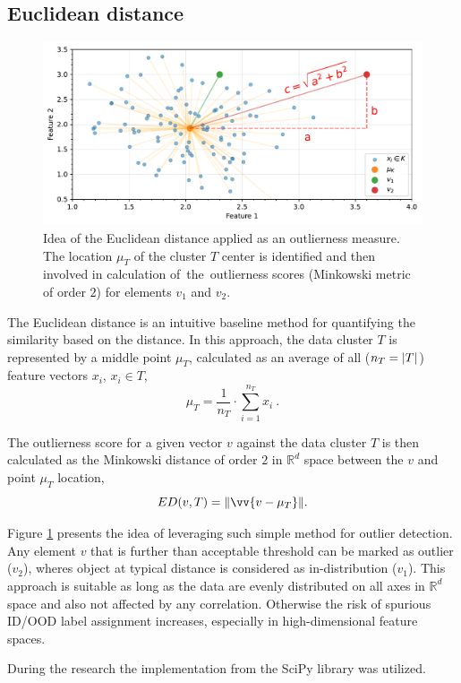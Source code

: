 \subsection{Euclidean distance}
\label{section:Euclidean}

\begin{figure}[t]
    \centering
    \includegraphics[width=\textwidth]{images/measures/euclidean-distance.pdf}
    \caption{Idea of the Euclidean distance applied as an outlierness measure. \\
             The location $\mu_T$ of the cluster $T$ center is identified and then involved
             in calculation of~the~outlierness scores (Minkowski metric of order $2$) for elements $v_1$ and $v_2$.}
    \label{fig:ed-idea}
\end{figure}

The Euclidean distance is an intuitive baseline method for quantifying the similarity based on the distance. In this approach, the data cluster $T$ is represented by a middle point $\mu_{T}$, calculated as an average of all ($n_{T} = \abs{T}$) feature vectors $x_i$, $x_i \in T$,
\begin{equation}
    \mu_{T} = \frac{1}{n_{T}} \cdot \sum_{i=1}^{n_{T}} x_i
    ~.
    \label{eq:mu_T}
\end{equation}

The outlierness score for a given vector $v$ against the data cluster $T$ is then calculated as the Minkowski distance of order $2$ in $\mathbb{R}^d$ space between the $v$ and point $\mu_{T}$ location,
\begin{equation}
    ED(v, T) = \norm{\vv{v - \mu_{T}}}
    .
    \label{eq:ed}
\end{equation}

Figure \ref{fig:ed-idea} presents the idea of leveraging such simple method for outlier detection. Any element $v$ that is further than acceptable threshold can be marked as outlier ($v_2$), wheres object at typical distance is considered as in-distribution ($v_1$). This approach is suitable as long as the data are evenly distributed on all axes in $\mathbb{R}^d$ space and also not affected by any correlation. Otherwise the risk of spurious ID/OOD label assignment increases, especially in high-dimensional feature spaces.

During the research the implementation from the SciPy library \cite{SciPy-NMeth} was utilized.
